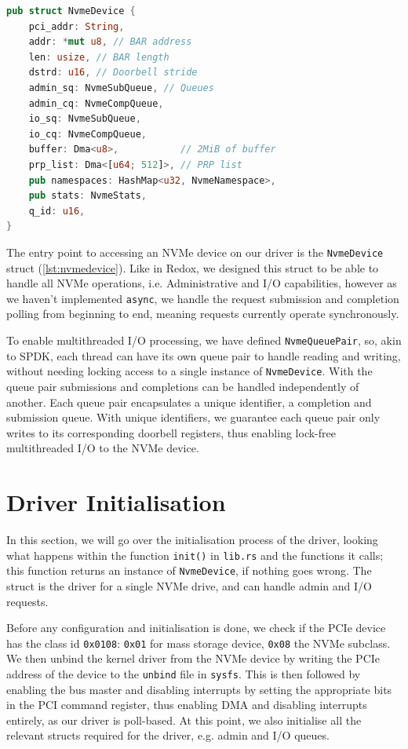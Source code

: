 \begin{lstlisting}[language=Rust,label=lst:nvmedevice,caption=NvmeDevice struct definition]
pub struct NvmeDevice {
    pci_addr: String,
    addr: *mut u8, // BAR address
    len: usize, // BAR length
    dstrd: u16, // Doorbell stride
    admin_sq: NvmeSubQueue, // Queues
    admin_cq: NvmeCompQueue,
    io_sq: NvmeSubQueue,
    io_cq: NvmeCompQueue,
    buffer: Dma<u8>,           // 2MiB of buffer
    prp_list: Dma<[u64; 512]>, // PRP list
    pub namespaces: HashMap<u32, NvmeNamespace>,
    pub stats: NvmeStats,
    q_id: u16,
}
\end{lstlisting}

The entry point to accessing an NVMe device on our driver is the \texttt{NvmeDevice} struct (\autoref{lst:nvmedevice}). Like in Redox, we designed this struct to be able to handle all NVMe operations, i.e. Administrative and I/O capabilities, however as we haven't implemented \texttt{async}, we handle the request submission and completion polling from beginning to end, meaning requests currently operate synchronously.

To enable multithreaded I/O processing, we have defined \texttt{NvmeQueuePair}, so, akin to SPDK, each thread can have its own queue pair to handle reading and writing, without needing locking access to a single instance of \texttt{NvmeDevice}. With the queue pair submissions and completions can be handled independently of another. Each queue pair encapsulates a unique identifier, a completion and submission queue. With unique identifiers, we guarantee each queue pair only writes to its corresponding doorbell registers, thus enabling lock-free multithreaded I/O to the NVMe device.

\section{Driver Initialisation}
In this section, we will go over the initialisation process of the driver, looking what happens within the function \texttt{init()} in \texttt{lib.rs} and the functions it calls; this function returns an instance of \texttt{NvmeDevice}, if nothing goes wrong. The struct is the driver for a single NVMe drive, and can handle admin and I/O requests.

Before any configuration and initialisation is done, we check if the PCIe device has the class id \texttt{0x0108}: \texttt{0x01} for mass storage device, \texttt{0x08} the NVMe subclass. We then unbind the kernel driver from the NVMe device by writing the PCIe address of the device to the \texttt{unbind} file in \texttt{sysfs}. This is then followed by enabling the bus master and disabling interrupts by setting the appropriate bits in the PCI command register, thus enabling DMA and disabling interrupts entirely, as our driver is poll-based. At this point, we also initialise all the relevant structs required for the driver, e.g. admin and I/O queues.

